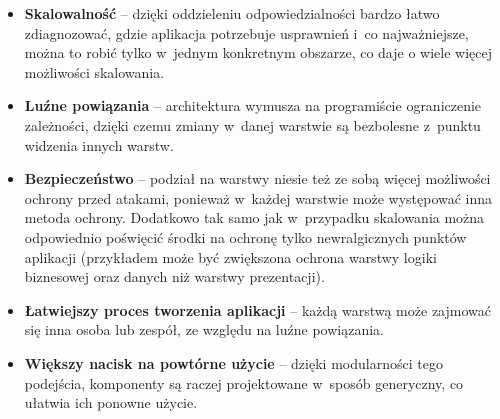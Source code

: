 \begin{itemize}
    \item \textbf{Skalowalność} -- dzięki oddzieleniu odpowiedzialności bardzo łatwo zdiagnozować, gdzie aplikacja potrzebuje usprawnień i~co najważniejsze, można to robić tylko w~jednym konkretnym obszarze, co daje o wiele więcej możliwości skalowania.
    \vspace{-1mm}
    \item \textbf{Luźne powiązania} -- architektura wymusza na programiście ograniczenie zależności, dzięki czemu zmiany w~danej warstwie są bezbolesne z~punktu widzenia innych warstw.
    \vspace{-1mm} 
    \item \textbf{Bezpieczeństwo} -- podział na warstwy niesie też ze sobą więcej możliwości ochrony przed atakami, ponieważ w~każdej warstwie może występować inna metoda ochrony. Dodatkowo tak samo jak w~przypadku skalowania można odpowiednio poświęcić środki na ochronę tylko newralgicznych punktów aplikacji (przykładem może być zwiększona ochrona warstwy logiki biznesowej oraz danych niż warstwy prezentacji).
    \vspace{-1mm}
    \item \textbf{Łatwiejszy proces tworzenia aplikacji} -- każdą warstwą może zajmować się inna osoba lub zespół, ze względu na luźne powiązania.
    \vspace{-1mm}
    \item \textbf{Większy nacisk na powtórne użycie} -- dzięki modularności tego podejścia, komponenty są raczej projektowane w~sposób generyczny, co ułatwia ich ponowne użycie.
\end{itemize}

